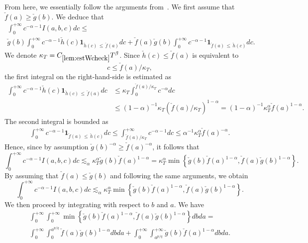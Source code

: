 \documentclass[10pt]{amsart}
\theoremstyle{definition}\newtheorem{defi}[theo]{Definition}\newtheorem{rema}[theo]{Remark}\newtheorem{exam}[theo]{Example}\newtheorem{exem}[theo]{Example}\newtheorem{nota}[theo]{Notation}
\newcommand{\bfun}{\mathbf{1}}
\begin{document}
From here, we essentially follow the arguments from~\cite{lieb2001analysis}. We first assume that $\check{f}(a) \geq \check{g}(b)$. We deduce that
\begin{multline*}
\int_0^{+\infty} c^{-\alpha-1} I(a,b,c)dc \leq\\
\check{g}(b) \int_0^{+\infty} c^{-\alpha-1} \check{h}(c)\bfun_{\check{h}(c)\,\leq\,\check{f}(a)}dc + \check{f}(a)\check{g}(b)\int_0^{+\infty}c^{-\alpha-1}\bfun_{\check{f}(a)\,\leq\,\check{h}(c) }dc.
\end{multline*}
We denote $\kappa_{T} = C_{\ref{lem:estWcheck}} T^{\beta}$. Since $\check{h}(c) \leq \check{f}(a)$ is equivalent to
\begin{equation*}
c\leq \check{f}(a)/\kappa_{T},
\end{equation*}
the first integral on the right-hand-side is estimated as
\begin{align*}
\int_0^{+\infty} c^{-\alpha-1} \check{h}(c)\bfun_{\check{h}(c)\,\leq\, \check{f}(a)}dc&\leq \kappa_T \int_0^{\check{f}(a)/\kappa_{T}} c^{-\alpha}dc
\\ &\leq (1-\alpha)^{-1}\kappa_T\left(\check{f}(a)/\kappa_{T}\right)^{1 - \alpha} = (1-\alpha)^{-1}\kappa_T^{\alpha} \check{f}(a)^{1-\alpha}.
\end{align*}
The second integral is bounded as
\begin{align*}
\int_0^{+\infty}c^{-\alpha-1}\bfun_{\check{f}(a)\,\leq\,\check{h}(c) }dc \leq \int_{\check{f}(a)/\kappa_{T}}^{+\infty}c^{-\alpha-1}dc \leq \alpha^{-1}\kappa_T^{\alpha} \check{f}(a)^{-\alpha}.
\end{align*}
Hence, since by assumption $\check{g}(b)^{-\alpha}\geq \check{f}(a)^{-\alpha}$, it follows that
\[
\int_0^{+\infty} c^{-\alpha-1} I(a,b,c)dc \lesssim_{\alpha} \kappa_T^{\alpha} \check{g}(b)\check{f}(a)^{1-\alpha} = \kappa_T^{\alpha} \min\left\{\check{g}(b)\check{f}(a)^{1-\alpha},\check{f}(a)\check{g}(b)^{1-\alpha}\right\}.
\]
By assuming that $\check{f}(a) \leq \check{g}(b)$ and following the same arguments, we obtain
\[
\int_0^{+\infty} c^{-\alpha-1} I(a,b,c)dc \lesssim_{\alpha} \kappa_T^{\alpha} \min\left\{\check{g}(b)\check{f}(a)^{1-\alpha}, \check{f}(a)\check{g}(b)^{1-\alpha}\right\}.
\]
We then proceed by integrating with respect to $b$ and $a$. We have
\begin{multline*}
\int_0^{+\infty} \int_0^{+\infty} \min\left\{ \check{g}(b)\check{f}(a)^{1-\alpha}, \check{f}(a)\check{g}(b)^{1-\alpha}\right\} db da =\\
\int_0^{+\infty}\int_0^{a^{p/q}}\check{f}(a)\check{g}(b)^{1-\alpha}dbda+\int_0^{+\infty}\int_{a^{p/q}}^{+\infty} \check{g}(b)\check{f}(a)^{1-\alpha} db da.
\end{multline*}
\end{document}
